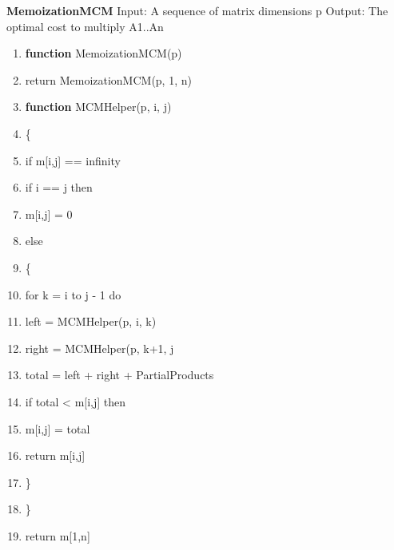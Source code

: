 \documentclass[conference]{IEEEtran}
\begin{document}
\textbf{MemoizationMCM}
\newline
Input: A sequence of matrix dimensions p
Output: The optimal cost to multiply A1..An

\begingroup
\renewcommand\labelenumi{\theenumi:}
\begin{enumerate}
\item \textbf{function} MemoizationMCM(p)  \label{item:1}
\item return MemoizationMCM(p, 1, n) \label{item:4}
\item \textbf{function} MCMHelper(p, i, j)  \label{item:1}
\item \{ \label{item:4}
\item if m[i,j] == infinity \label{item:4}
\item if i == j then
\item m[i,j] = 0 \label{item:4}\label{item:4}
\item else \label{item:4}
\item \{ \label{item:4}
\item for k = i to j - 1 do\label{item:4}
\item left = MCMHelper(p, i, k) \label{item:4}
\item right = MCMHelper(p, k+1, j \label{item:4}
\item total = left + right + PartialProducts \label{item:4}
\item if total < m[i,j] then \label{item:4}
\item m[i,j] = total \label{item:4}
\item return m[i,j] \label{item:4}
\item \} \label{item:4}
\item \} \label{item:4}
\item return m[1,n] \label{item:4}
\end{enumerate}
\endgroup
\end{document}
